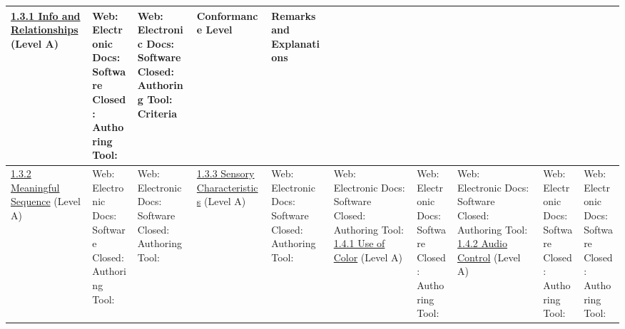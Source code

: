 \documentclass[a4paper]{report}
\begin{document}
\begin{longtable}{|l|l|l|}
 	\hline
 	\href{http://www.w3.org/TR/WCAG20/#content-structure-separation-programmatic}{1.3.1 Info and Relationships} (Level A) &
 	\makecell{Web: \\ Electronic Docs: \\ Software \\ Closed: \\ Authoring Tool:} & \makecell{Web: \\ Electronic Docs: \\ Software \\ Closed: \\ Authoring Tool:} 
 	\hline \newpage \hline
 	Criteria & Conformance Level & Remarks and Explanations \\
 	\hline
    \href{http://www.w3.org/TR/WCAG20/#content-structure-separation-programmatic}{1.3.2 Meaningful Sequence} (Level A) &
 	\makecell{Web: \\ Electronic Docs: \\ Software \\ Closed: \\ Authoring Tool:} & \makecell{Web: \\ Electronic Docs: \\ Software \\ Closed: \\ Authoring Tool:} & \hline
 	\href{http://www.w3.org/TR/WCAG20/#content-structure-separation-understanding}{1.3.3 Sensory Characteristics} (Level A) & \makecell{Web: \\ Electronic Docs: \\ Software \\ Closed: \\ Authoring Tool:} & \makecell{Web: \\ Electronic Docs: \\ Software \\ Closed: \\ Authoring Tool:} 
 	\hline
 	\href{http://www.w3.org/TR/WCAG20/#visual-audio-contrast-without-color}{1.4.1 Use of Color} (Level A) & \makecell{Web: \\ Electronic Docs: \\ Software \\ Closed: \\ Authoring Tool:} & \makecell{Web: \\ Electronic Docs: \\ Software \\ Closed: \\ Authoring Tool:} 
 	\hline
 	\href{http://www.w3.org/TR/WCAG20/#visual-audio-contrast-dis-audio}{1.4.2 Audio Control} (Level A) & \makecell{Web: \\ Electronic Docs: \\ Software \\ Closed: \\ Authoring Tool:} & \makecell{Web: \\ Electronic Docs: \\ Software \\ Closed: \\ Authoring Tool:}

\end{longtable}
\end{document}
